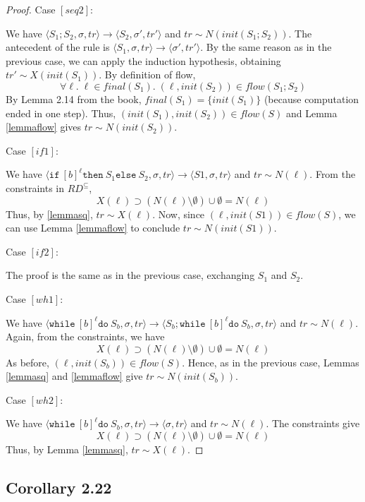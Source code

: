 \documentclass[a4wide,12pt]{article}
\theoremstyle{definition}
\theoremstyle{plain}
\theoremstyle{remark}
\def\const#1{\mathopen{\langle}#1\mathclose{\rangle}} %
\def\pair#1{\const{#1}}
\def\whilel{\texttt{while}\ }
\def\dol {\texttt{do}\ }
\def\ifl {\texttt{if}\ }
\def\thenl {\texttt{then}\ }
\def\elsel {\texttt{else}\ }
\begin{document}
\begin{proof}
Case $[seq2]$:

We have $\pair{S_1;S_2,\sigma,tr} \to \pair{S_2,\sigma',tr'}$ and $tr \sim N(init(S_1;S_2))$.
The antecedent of the rule is $\pair{S_1,\sigma,tr} \to \pair{\sigma',tr'}$.
By the same reason as in the previous case, we can apply the induction hypothesis, obtaining
$tr' \sim X(init(S_1))$. By definition of flow, \[\forall \ell . \; \ell \in final(S_1). \;(\ell,init(S_2)) \in flow(S_1;S_2)\]
By Lemma 2.14 from the book, $final(S_1) = \{init(S_1)\}$ (because computation ended in one step). Thus,
$(init(S_1),init(S_2)) \in flow(S)$ and Lemma \ref{lemmaflow} gives $tr \sim N(init(S_2))$.

Case $[if1]$:

We have $\pair{\ifl [b]^\ell \thenl S_1 \elsel S_2,\sigma,tr} \to \pair{S1,\sigma,tr}$ and $tr \sim N(\ell)$.
From the constraints in $RD^{\subseteq}$, 
\[ X(\ell) \supset (N(\ell) \setminus \emptyset) \cup \emptyset = N(\ell)\]
Thus, by \ref{lemmasq}, $tr \sim X(\ell)$. Now, since $(\ell,init(S1)) \in flow(S)$, we can use Lemma \ref{lemmaflow}
to conclude $tr \sim N(init(S1))$.

Case $[if2]$:

The proof is the same as in the previous case, exchanging $S_1$ and $S_2$.

Case $[wh1]$:

We have $\pair{\whilel [b]^\ell \dol S_b,\sigma,tr} \to \pair{S_b;\whilel [b]^\ell \dol S_b,\sigma,tr}$ and $tr \sim N(\ell)$.
Again, from the constraints, we have
\[X(\ell) \supset (N(\ell) \setminus \emptyset) \cup \emptyset = N(\ell)\]
As before, $(\ell,init(S_b)) \in flow(S)$. Hence, as in the previous case, Lemmas \ref{lemmasq} and \ref{lemmaflow} give
$tr \sim N(init(S_b))$.

Case $[wh2]$:

We have $\pair{\whilel [b]^\ell \dol S_b,\sigma,tr} \to \pair{\sigma,tr}$ and $tr \sim N(\ell)$.
The constraints give
\[X(\ell) \supset (N(\ell) \setminus \emptyset) \cup \emptyset = N(\ell)\]
Thus, by Lemma \ref{lemmasq}, $tr \sim X(\ell)$.

\end{proof}

\subsection{Corollary 2.22}
\end{document}
